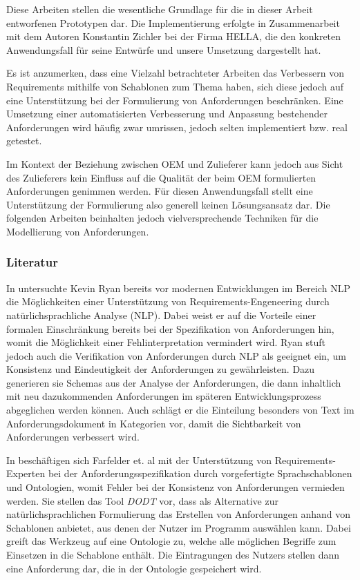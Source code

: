 \documentclass[12pt]{report}
\begin{document}
Diese Arbeiten stellen die wesentliche Grundlage für die in dieser Arbeit entworfenen Prototypen dar. Die Implementierung erfolgte in Zusammenarbeit mit dem Autoren Konstantin Zichler bei der Firma HELLA, die den konkreten Anwendungsfall für seine Entwürfe und unsere Umsetzung dargestellt hat.

\vspace{12pt}

Es ist anzumerken, dass eine Vielzahl betrachteter Arbeiten das Verbessern von Requirements mithilfe von Schablonen zum Thema haben, sich diese jedoch auf eine Unterstützung bei der Formulierung von Anforderungen beschränken. Eine Umsetzung einer automatisierten Verbesserung und Anpassung bestehender Anforderungen wird häufig zwar umrissen, jedoch selten implementiert bzw. real getestet. 

Im Kontext der Beziehung zwischen OEM und Zulieferer kann jedoch aus Sicht des Zulieferers kein Einfluss auf die Qualität der beim OEM formulierten Anforderungen genimmen werden. Für diesen Anwendungsfall stellt eine Unterstützung der Formulierung also generell keinen Lösungsansatz dar. Die folgenden Arbeiten beinhalten jedoch vielversprechende Techniken für die Modellierung von Anforderungen. 

\subsubsection{Literatur}
In \cite{kr93} untersuchte Kevin Ryan bereits vor modernen Entwicklungen im Bereich NLP die Möglichkeiten einer Unterstützung von Requirements-Engeneering durch natürlichsprachliche Analyse (NLP). Dabei weist er auf die Vorteile einer formalen Einschränkung bereits bei der Spezifikation von Anforderungen hin, womit die Möglichkeit einer Fehlinterpretation vermindert wird. Ryan stuft jedoch auch die Verifikation von Anforderungen durch NLP als geeignet ein, um Konsistenz und Eindeutigkeit der Anforderungen zu gewährleisten. Dazu generieren sie Schemas aus der Analyse der Anforderungen, die dann inhaltlich mit neu dazukommenden Anforderungen im späteren Entwicklungsprozess abgeglichen werden können. Auch schlägt er die Einteilung besonders von Text im Anforderungsdokument in Kategorien vor, damit die Sichtbarkeit von Anforderungen verbessert wird.

\vspace{12pt}

In \cite{ff11} beschäftigen sich Farfelder et. al mit der Unterstützung von Requirements-Experten bei der Anforderungsspezifikation durch vorgefertigte Sprachschablonen und Ontologien, womit Fehler bei der Konsistenz von Anforderungen vermieden werden. Sie stellen das Tool \textit{DODT} vor, dass als Alternative zur natürlichsprachlichen Formulierung das Erstellen von Anforderungen anhand von Schablonen anbietet, aus denen der Nutzer im Programm auswählen kann. Dabei greift das Werkzeug auf eine Ontologie zu, welche alle möglichen Begriffe zum Einsetzen in die Schablone enthält. Die Eintragungen des Nutzers stellen dann eine Anforderung dar, die in der Ontologie gespeichert wird.
\end{document}
